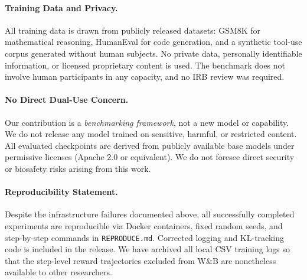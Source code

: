 \paragraph{Training Data and Privacy.}
All training data is drawn from publicly released datasets: GSM8K
\citep{cobbe2021training} for mathematical reasoning, HumanEval
\citep{chen2021codex} for code generation, and a synthetic tool-use corpus
generated without human subjects. No private data, personally identifiable
information, or licensed proprietary content is used. The benchmark does not
involve human participants in any capacity, and no IRB review was required.

\paragraph{No Direct Dual-Use Concern.}
Our contribution is a \emph{benchmarking framework}, not a new model or
capability. We do not release any model trained on sensitive, harmful, or
restricted content. All evaluated checkpoints are derived from publicly
available base models under permissive licenses (Apache 2.0 or equivalent).
We do not foresee direct security or biosafety risks arising from this work.

\paragraph{Reproducibility Statement.}
Despite the infrastructure failures documented above, all successfully
completed experiments are reproducible via Docker containers, fixed random
seeds, and step-by-step commands in \texttt{REPRODUCE.md}. Corrected logging
and KL-tracking code is included in the release. We have archived all local
CSV training logs so that the step-level reward trajectories excluded from
W\&B are nonetheless available to other researchers.

